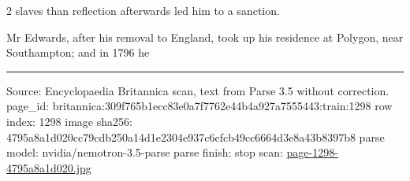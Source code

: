 \documentclass[10pt]{article}
\begin{document}
\begin{multicols}{2}
slaves than reflection afterwards led him to a sanction.

Mr Edwards, after his removal to England, took up his residence at Polygon, near Southampton; and in 1796 he

\end{multicols}
\vfill\par\noindent\rule{\linewidth}{0.4pt}\par
{\scriptsize\color{gray}\noindent Source: Encyclopaedia Britannica scan, text from Parse 3.5 without correction. page\_id: britannica:309f765b1ecc83e0a7f7762e44b4a927a7555443:train:1298 \quad row index: 1298 \quad image sha256: 4795a8a1d020cc79cdb250a14d1e2304e937c6cfcb49cc6664d3e8a43b8397b8 \quad parse model: nvidia/nemotron-3.5-parse \quad parse finish: stop \quad scan: \href{../scans/page-1298-4795a8a1d020.jpg}{page-1298-4795a8a1d020.jpg}\par}
\end{document}
